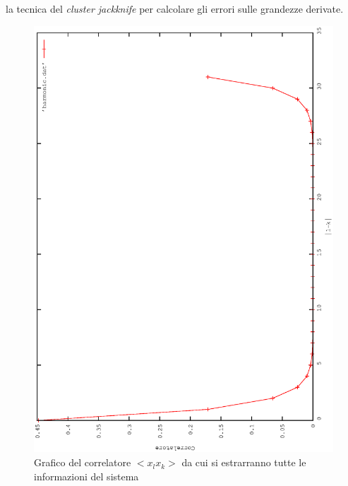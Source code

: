 la tecnica del \emph{cluster jackknife} per calcolare gli errori sulle grandezze derivate.\\
\begin{figure}[h]
 \centering
 \includegraphics[width= 0.7\columnwidth,angle= -90]{harmonic_giusto.eps}
 \caption{\small{Grafico del correlatore $<x_l x_k>$ da cui si estrarranno tutte le informazioni del sistema}}
 \end{figure}

